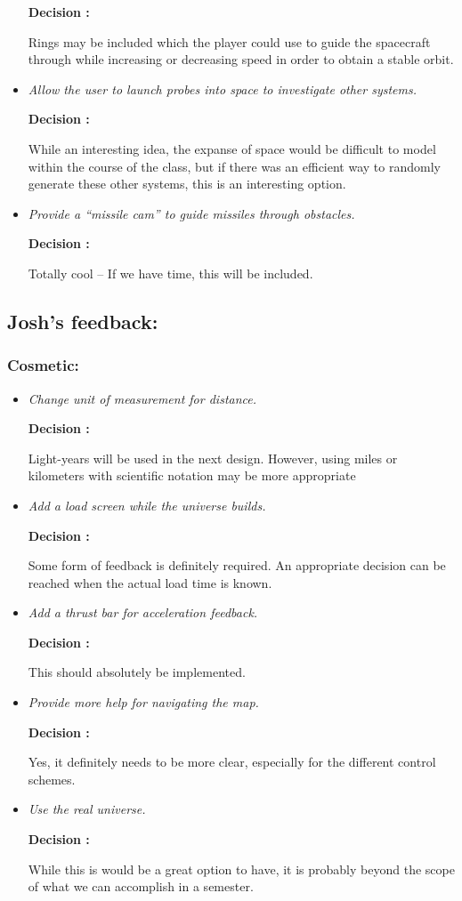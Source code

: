 \begin{itemize}
        \textbf{Decision : } \parbox[t]{5in}{Rings may be included which the player could use to guide the spacecraft through while increasing or decreasing speed in order to obtain a stable orbit.}

  \item \emph{Allow the user to launch probes into space to investigate other systems.}
        
        \textbf{Decision : } \parbox[t]{5in}{While an interesting idea, the expanse of space would be difficult to model within the course of the class, but if there was an efficient way to randomly generate these other systems, this is an interesting option.}

  \item \emph{Provide a ``missile cam'' to guide missiles through obstacles.}
        
        \textbf{Decision : } \parbox[t]{5in}{Totally cool -- If we have time, this will be included.}
\end{itemize}

\subsection{Josh's feedback:}
\subsubsection{Cosmetic:}
\begin{itemize}
  \item \emph{Change unit of measurement for distance.}
        
        \textbf{Decision : } \parbox[t]{5in}{Light-years will be used in the next design. However, using miles or kilometers with scientific notation may be more appropriate}

  \item \emph{Add a load screen while the universe builds.}

        \textbf{Decision : } \parbox[t]{5in}{Some form of feedback is definitely required. An appropriate decision can be reached when the actual load time is known.}

  \item \emph{Add a thrust bar for acceleration feedback.}

        \textbf{Decision : } \parbox[t]{5in}{This should absolutely be implemented.}

  \item \emph{Provide more help for navigating the map.}

        \textbf{Decision : } \parbox[t]{5in}{Yes, it definitely needs to be more clear, especially for the different control schemes.}

  \item \emph{Use the real universe.}

        \textbf{Decision : } \parbox[t]{5in}{While this is would be a great option to have, it is probably beyond the scope of what we can accomplish in a semester.}
\end{itemize}

